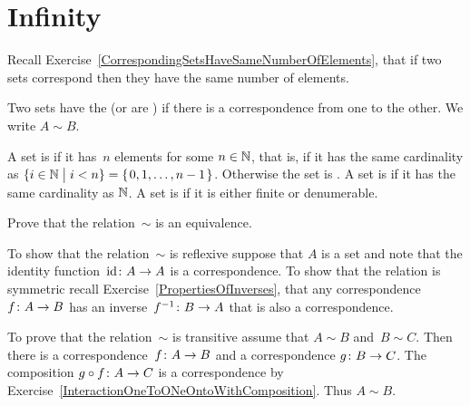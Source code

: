 \chapter{Infinity}

Recall Exercise~\ref{CorrespondingSetsHaveSameNumberOfElements},
that if two sets correspond then they have the same number of elements.

\begin{df}
Two sets have the  
(or are ) if there is a 
correspondence from one to the other.
We write $A\sim B$.   
\end{df}

\begin{df}
A set is  if it has~$n$ elements for some $n\in\mathbb{N}$,
that is, if it has the same cardinality as 
$\{i\in\mathbb{N} \bigm| i< n\}=\mbox{$\{\hspace{0.1em}0,1,\ldots,n-1\hspace{0.1em}\}$}$.
Otherwise the set is .   
A set is  if it has the same cardinality 
as $\mathbb{N}$.
A set is  if it is either finite or denumerable.
\end{df}

\begin{ex} \label{ex:EquinumeruousIsEquivalence}
Prove that the relation~$\sim$ is an equivalence.
\begin{ans}
  To show that the relation~$\sim$ is reflexive 
  suppose that $A$ is a set and note that the 
  identity function~$\mbox{$\operatorname{id}\colon A\to A$}$ is a correspondence.
  To show that the relation is symmetric recall 
  Exercise~\ref{PropertiesOfInverses}, that
  any correspondence~$\mbox{$f\colon A\to B$}$ has an inverse~$\mbox{$f^{-1}\colon B\to A$}$
  that is also a correspondence.

  To prove that the relation~$\sim$ is transitive assume that 
  $A\sim B$ and~$B\sim C$.
  Then there is a correspondence~$\mbox{$f\colon A\to B$}$ and a 
  correspondence $\mbox{$g\colon B\to C$}$.
  The composition $\mbox{$g\mathbin{\circ} f\colon A\to C$}$ is a correspondence
  by Exercise~\ref{InteractionOneToONeOntoWithComposition}.
  Thus $A\sim B$.
\end{ans}
\end{ex}

